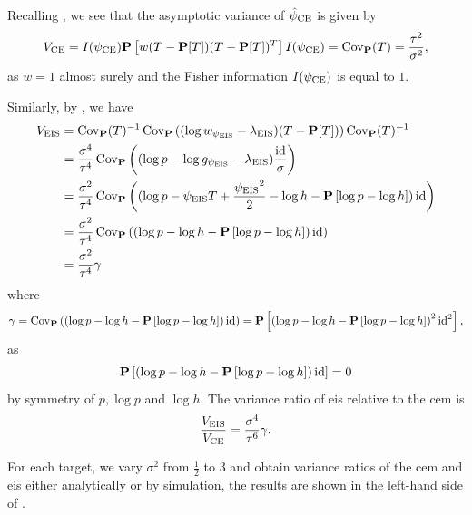 \begin{example}
    \label{ex:avrs-s2-fixed}
    Recalling , we see that the asymptotic variance of ${\hat\psi_{\text{CE}}}$ is given by  
    $$
        V_{\text{CE}} = I({\psi_{\text{CE}}}) \mathbf P \left[w(T - \mathbf P [T]) (T - \mathbf P [T])^{T} \right] I({\psi_{\text{CE}}}) = \operatorname{Cov}_{\mathbf P}(T) = \frac{\tau^{2}}{\sigma^{2}},
    $$
    as $w = 1$ almost surely and the Fisher information $I({\psi_{\text{CE}}})$ is equal to $1$. 

    Similarly, by , we have 
    \begin{align*}
        V_{\text{EIS}} &= \operatorname{Cov}_{\mathbf P}(T)^{-1} \operatorname{Cov}_{\mathbf P} \left( (\log w_{\psi_{{\text{EIS}}}} - \lambda_{{\text{EIS}}}) (T - \mathbf P[T]) \right)\operatorname{Cov}_{\mathbf P}(T)^{-1} \\
        &= \frac{\sigma^{4}}{\tau^{4}} \operatorname{Cov}_{\mathbf P} \left( (\log p - \log g_{{\psi_{\text{EIS}}}} - \lambda_{{\text{EIS}}}) \frac{\operatorname{id}}{\sigma}\right) \\
        &= \frac{\sigma^{2}}{\tau^{4}} \operatorname{Cov}_{\mathbf P} \left( (\log p - {\psi_{\text{EIS}}} T + \frac{{\psi_{\text{EIS}}}^{2}}{2} - \log h - \mathbf P\left[\log p - \log h\right]) \operatorname{id} \right) \\
        &= \frac{\sigma^{2}}{\tau^{4}} \operatorname{Cov}_{\mathbf P} \left( (\log p - \log h - \mathbf P \left[ \log p - \log h \right]) \operatorname{id} \right) \\
        &= \frac{\sigma^{2}}{\tau^{4}} \gamma
    \end{align*}
    where 
    $$\gamma = \operatorname{Cov}_{\mathbf P} \left( (\log p - \log h - \mathbf P \left[ \log p - \log h \right]) \operatorname{id} \right) = \mathbf P \left[ \left( \log p - \log h - \mathbf P\left[\log p - \log h\right] \right)^{2}\operatorname{id}^{2}  \right],$$
    as 
    $$
      \mathbf P \left[  (\log p - \log h - \mathbf P \left[ \log p - \log h \right]) \operatorname{id}  \right] = 0
    $$
    by symmetry of $p, \log p$ and $\log h$. 
    The variance ratio of \gls{eis} relative to the \gls{cem} is 
    $$
        \frac{V_{{\text{EIS}}}}{V_{{\text{CE}}}} = \frac{\sigma^{4}}{\tau^{6}} \gamma.
    $$
    
    For each target, we vary $\sigma^{2}$ from $\frac{1}{2}$ to $3$ and obtain variance ratios of the \gls{cem} and \gls{eis} either analytically or by simulation, the results are shown in the left-hand side of .

    \begin{figure}
        \centering


\end{figure}
\end{example}
